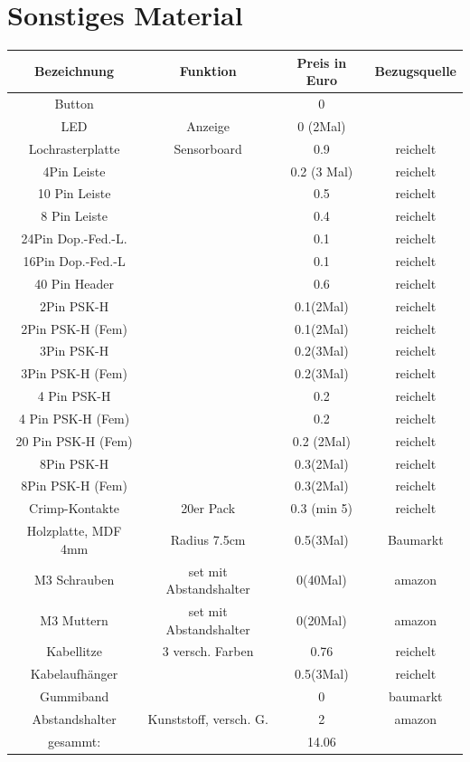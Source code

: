 \documentclass[twoside,12pt,a4paper]{report}
\begin{document}
	\section{Sonstiges Material}
	\begin{center}
		\begin{tabular}{|c|c|c|c|}
			\hline
			Bezeichnung			&Funktion				& Preis	in Euro			&Bezugsquelle\\
			\hline
			Button				&						& 0				& 		\\
			LED					&Anzeige				& 0 (2Mal)		&		\\
			Lochrasterplatte	&Sensorboard			& 0.9			& reichelt		\\
			4Pin Leiste			& 						& 0.2 (3 Mal)	& reichelt		\\
			10 Pin Leiste		&						& 0.5			& reichelt		\\
			8 Pin Leiste		&						& 0.4			& reichelt		\\
			24Pin Dop.-Fed.-L.	&						& 0.1			& reichelt		\\
			16Pin Dop.-Fed.-L	&						& 0.1			& reichelt		\\
			40 Pin Header		&						& 0.6			& reichelt		\\
			2Pin PSK-H			&						& 0.1(2Mal)		& reichelt	\\
			2Pin PSK-H (Fem)	&						& 0.1(2Mal)		& reichelt	\\
			3Pin PSK-H			&						& 0.2(3Mal)		& reichelt		\\
			3Pin PSK-H (Fem)	&						& 0.2(3Mal)		& reichelt		\\
			4 Pin PSK-H			&						& 0.2			& reichelt\\
			4 Pin PSK-H	(Fem)	&						& 0.2			& reichelt\\
			20 Pin PSK-H	(Fem)&						& 0.2 (2Mal)	& reichelt\\
			8Pin PSK-H			&						& 0.3(2Mal)		& reichelt\\
			8Pin PSK-H (Fem)	&						& 0.3(2Mal)		& reichelt\\
			Crimp-Kontakte		& 20er Pack				& 0.3 (min 5)	& reichelt\\
			Holzplatte, MDF 4mm	& Radius 7.5cm			& 0.5(3Mal)		& Baumarkt		\\
			M3 Schrauben		& set mit Abstandshalter& 0(40Mal)		& amazon		\\
			M3 Muttern			& set mit Abstandshalter& 0(20Mal)		& amazon		\\
			Kabellitze			& 3 versch. Farben		& 0.76			& reichelt		\\
			Kabelaufhänger		&						& 0.5(3Mal)		& reichelt		\\
			Gummiband			&						& 0				& baumarkt\\
			Abstandshalter 		& Kunststoff, versch. G.& 2				& amazon		\\
			\hline
			gesammt: 			&						&14.06			&\\
			\hline
		\end{tabular}
	\end{center}
	
\end{document}
